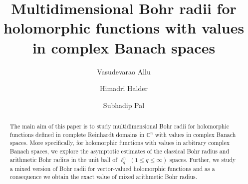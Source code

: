 \documentclass[a4paper,12pt]{amsart}
\theoremstyle{definition}
\newcounter{minutes}\setcounter{minutes}{\time}
\newcounter{hours}\setcounter{hours}{\time}
\begin{document}
\title{Multidimensional Bohr radii for holomorphic functions with values in complex Banach spaces}


\author{Vasudevarao Allu}
\address{Vasudevarao Allu,
Department of Mathematics,
School of Basic Sciences,
Indian Institute of Technology Bhubaneswar,
Bhubaneswar-752050, Odisha, India.}

\author{Himadri Halder}
\address{Himadri Halder,
Department of Mathematics, 
Indian Institute of Science, Bangalore-560012,
India}

\author{Subhadip Pal}
\address{Subhadip Pal,
	School of Mathematical Sciences,
	National Institute of Science Education and Research,
	Bhubaneswar, An OCC of Homi Bhabha National Institute, Jatni 752050,
	India.}




\def\thefootnote{}
 \makeatletter\def\thefootnote{\@arabic\c@footnote}\makeatother



\begin{abstract}

The main aim of this paper is to study multidimensional Bohr radii for holomorphic functions defined in complete Reinhardt domains in $\mathbb{C}^n$ with values in complex Banach spaces. More specifically, for holomorphic functions with values in arbitrary complex Banach spaces, we explore the asymptotic estimates of the classical Bohr radius and arithmetic Bohr radius in the unit ball of $\ell^n_q$ $(1\leq q\leq \infty)$ spaces. Further, we study a mixed version of Bohr radii for vector-valued holomorphic functions and as a consequence we obtain the exact value of mixed arithmetic Bohr radius.
  
\end{abstract}



\maketitle
\pagestyle{myheadings}
\end{document}
